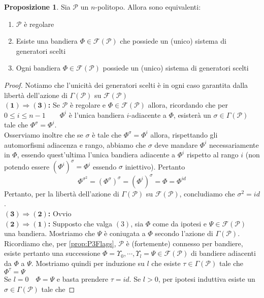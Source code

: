 \documentclass[a4paper,12pt]{report}
\newcommand{\p}{\mathcal{P}}
\theoremstyle{plain}
\theoremstyle{definition}
\newtheorem{prop}[teo]{Proposizione}
\newcommand\locallabel[1]{\label{\currentprefix_#1}}
\newcommand\implication[2]{$\bm{(#1)\Rightarrow(#2)}$\textbf{: }}
\newcommand\flag[1]{\mathcal{F}(#1)}
\begin{document}
\begin{prop}
\def\currentprefix{prop:IntroInvolutions}
\label{prop:IntroInvolutions}
Sia $\p$ un $n$-politopo. Allora sono equivalenti:
\begin{enumerate}
\item\locallabel{1}$\p$ \`e regolare
\item\locallabel{2}Esiste una bandiera $\Phi\in\flag{\p}$ che possiede un (unico) sistema di generatori scelti
\item\locallabel{3}Ogni bandiera $\Phi\in\flag{\p}$ possiede un (unico) sistema di generatori scelti
\end{enumerate}
\end{prop}
\begin{proof}
Notiamo che l'unicit\`a dei generatori scelti \`e in ogni caso garantita dalla libert\`a dell'azione di $\Gamma(\p)$ su $\flag{\p}$\\
\implication{1}{3}Se $\p$ \`e regolare e $\Phi\in\flag{\p}$ allora, ricordando che per $0\leq i\leq n-1\qquad\Phi^i$ \`e l'unica bandiera
$i$-adiacente a $\Phi$, esister\`a un $\sigma\in\Gamma(\p)$ tale che $\Phi^\sigma=\Phi^i$.\\
Osserviamo inoltre che se $\sigma$ \`e tale che $\Phi^\sigma=\Phi^i$ allora, rispettando gli automorfismi adiacenza e rango, abbiamo che
$\sigma$ deve mandare $\Phi^i$ necessariamente in $\Phi$, essendo quest'ultima l'unica bandiera adiacente a $\Phi^i$ rispetto al rango $i$
(non potendo essere $(\Phi^i)^\sigma=\Phi^i$ essendo $\sigma$ iniettivo). Pertanto
\begin{equation*}
\Phi^{\sigma^2}=(\Phi^\sigma)^\sigma=(\Phi^i)^\sigma=\Phi=\Phi^{id}
\end{equation*}
Pertanto, per la libert\`a dell'azione di $\Gamma(\p)$ su $\flag{\p}$, concludiamo che $\sigma^2=id$.\\
\implication{3}{2}Ovvio\\
\implication{2}{1}Supposto che valga $(3)$, sia $\Phi$ come da ipotesi e $\Psi\in\flag{\p}$ una bandiera. Mostriamo che
$\Psi$ \`e coniugata a $\Phi$ secondo l'azione di $\Gamma(\p)$.\\
Ricordiamo che, per \ref{prop:P3Flags}, $\p$ \`e (fortemente) connesso per bandiere, esiste pertanto una successione
$\Phi=\Upsilon_0,\cdots,\Upsilon_l=\Psi\in\flag{\p}$ di bandiere adiacenti da $\Phi$ a
$\Psi$. Mostriamo quindi per induzione su $l$ che esiste $\tau\in\Gamma(\p)$ tale che $\Phi^\tau=\Psi$\\
Se $l=0\quad\Phi=\Psi$ e basta prendere $\tau=id$. Se $l>0$, per ipotesi induttiva esiste un $\sigma\in\Gamma(\p)$ tale che

\end{proof}
\end{document}
